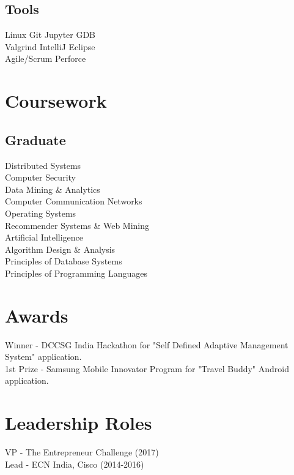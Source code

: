 \documentclass[]{deedy-resume-openfont}
\begin{document}
\begin{minipage}[t]{0.33\textwidth}
\subsection{Tools}
Linux \textbullet{} Git \textbullet{} Jupyter \textbullet{} GDB  \\
Valgrind \textbullet{} IntelliJ \textbullet{} Eclipse\\
Agile/Scrum \textbullet{} Perforce
\sectionsep


\section{Coursework}
\subsection{Graduate}
\textbullet{} Distributed Systems \\
\textbullet{} Computer Security \\
\textbullet{} Data Mining \& Analytics  \\
\textbullet{} Computer Communication Networks\\
\textbullet{} Operating Systems \\
\textbullet{} Recommender Systems \& Web Mining \\
\textbullet{} Artificial Intelligence  \\
\textbullet{} Algorithm Design \& Analysis \\
\textbullet{} Principles of Database Systems \\
\textbullet{} Principles of Programming Languages \\
\sectionsep


\section{Awards} 
\textbullet{} Winner - DCCSG India Hackathon for "Self Defined Adaptive Management System" application. \\
\textbullet{} 1st Prize - Samsung Mobile Innovator Program for "Travel Buddy" Android application. \\
\sectionsep

\section{Leadership Roles} 
\textbullet{} VP - The Entrepreneur Challenge (2017)\\
\textbullet{} Lead - ECN India, Cisco (2014-2016)\\
\sectionsep

%
%

\end{minipage} 
\end{document}

